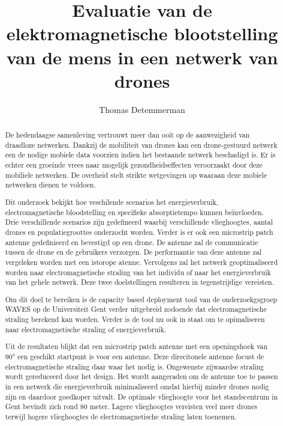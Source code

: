 \documentclass[twocolumn]{phdsymp_dutch}
\begin{document}
\title{	Evaluatie van de elektromagnetische blootstelling van de mens in een netwerk van drones}

\author{Thomas Detemmerman}


\maketitle

\begin{abstract}

De hedendaagse samenleving vertrouwt meer dan ooit op de aanwezigheid van draadloze netwerken. 
Dankzij de mobiliteit van  drones kan een drone-gestuurd netwerk een de nodige mobiele data voorzien 
indien het bestaande netwerk beschadigd is.
Er is echter een groeinde vrees naar mogelijk gezondheidseffecten veroorzaakt door deze
mobiliele netwerken. De overheid stelt strikte wetgevingen op waaraan deze mobiele netwerken dienen te voldoen.

Dit onderzoek bekijkt hoe veschilende scenarios het energieverbruik, electromagnetische bloodstelling en 
specifieke absorptietempo kunnen be\"invloeden.
Drie verschillende scenarios zijn gedefineerd waarbij verschillende vlieghoogtes, aantal drones en 
populatiegroottes onderzocht worden.
Verder is er ook een microstrip patch antenne gedefinieerd en bevestigd op een drone. 
De antenne zal de communicatie tussen de drone en de gebruikers verzorgen.
De performantie van deze antenne zal vergeleken worden met een istorope atenne.
Vervolgens zal het netwerk geoptimaliseerd worden naar electromagnetische straling van het individu of 
naar het energieverbruik van het gehele netwerk. Deze twee doelstellingen resulteren in 
tegenstrijdige vereisten. 

Om dit doel te bereiken is de capacity based deployment tool van de onderzoekgsgroep WAVES op de 
Universiteit Gent verder uitgebreid zodoende dat electromagnetische straling berekend kan worden.
Verder is de tool nu ook in staat om te opimaliseren naar electromagnetische straling of energieverbruik. 

Uit de resultaten blijkt dat een microstrip patch antenne
met een openingshoek van \ang{90} een geschikt startpunt is voor een antenne.
Deze direcitonele  antenne focust de electromagnetische straling daar waar het nodig is.
Ongewenste zijwaardse straling wordt gereduceerd door het design.
Het wordt aangeraden om de antenne toe te passen in een netwerk die energieverbruik minimaliseerd
omdat hierbij minder drones nodig zijn en daardoor goedkoper uitvalt.
De optimale vlieghoogte voor het standscentrum in Gent bevindt zich rond 80  meter.
Lagere vlieghoogtes vereisten veel meer drones terwijl hogere vlieghoogtes de 
electromagnetische straling laten toenemen.
\end{abstract}
\end{document}
